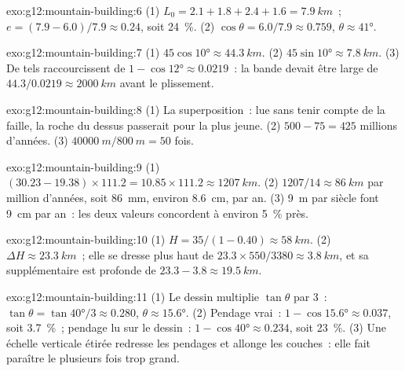 \begin{solution}{exo:g12:mountain-building:6}
(1) $L_0 = 2.1 + 1.8 + 2.4 + 1.6 = \qty{7.9}{km}$~;
$e = (7.9 - 6.0)/7.9 \approx 0.24$, soit \qty{24}{\percent}. (2) $\cos\theta =
6.0/7.9 \approx 0.759$, $\theta \approx \ang{41}$.
\end{solution}

\begin{solution}{exo:g12:mountain-building:7}
(1) $45\cos\ang{10} \approx \qty{44.3}{km}$. (2) $45\sin\ang{10} \approx
\qty{7.8}{km}$. (3) De tels  raccourcissent de
$1 - \cos\ang{12} \approx 0.0219$~: la bande devait être large de
$44.3/0.0219 \approx \qty{2000}{km}$ avant le plissement.
\end{solution}

\begin{solution}{exo:g12:mountain-building:8}
(1) La superposition~: lue sans tenir compte de la faille, la roche du
dessus passerait pour la plus jeune. (2) $500 - 75 = 425$ millions
d'années. (3) $\qty{40000}{m} /
\qty{800}{m} = 50$ fois.
\end{solution}

\begin{solution}{exo:g12:mountain-building:9}
(1) $(30.23 - 19.38) \times 111.2 = 10.85 \times 111.2 \approx
\qty{1207}{km}$. (2) $1207/14 \approx \qty{86}{km}$ par million d'années,
soit \qty{86}{mm}, environ \qty{8.6}{cm}, par an. (3) \qty{9}{m} par siècle
font \qty{9}{cm} par an~: les deux valeurs concordent à environ
\qty{5}{\percent} près.
\end{solution}

\begin{solution}{exo:g12:mountain-building:10}
(1) $H = 35/(1 - 0.40) \approx \qty{58}{km}$. (2) $\Delta H \approx
\qty{23.3}{km}$~; elle se dresse plus haut de $23.3 \times 550/3380 \approx
\qty{3.8}{km}$, et sa  supplémentaire est profonde de
$23.3 - 3.8 \approx \qty{19.5}{km}$.
\end{solution}

\begin{solution}{exo:g12:mountain-building:11}
(1) Le dessin multiplie $\tan\theta$ par 3~: $\tan\theta = \tan\ang{40}/3
\approx 0.280$, $\theta \approx \ang{15.6}$. (2) Pendage vrai~: $1 - \cos\ang{15.6}
\approx 0.037$, soit \qty{3.7}{\percent}~; pendage lu sur le dessin~: $1 - \cos\ang{40}
\approx 0.234$, soit \qty{23}{\percent}. (3) Une échelle verticale étirée
redresse les pendages et allonge les couches~: elle fait paraître le
 plusieurs fois trop grand.
\end{solution}

